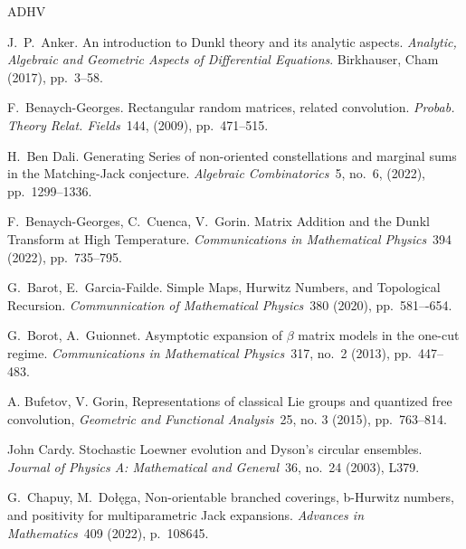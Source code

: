 \documentclass[11pt]{article}
\theoremstyle{plain}
\begin{document}
\begin{thebibliography}{ADHV}

J.~P.~Anker. An introduction to Dunkl theory and its analytic aspects. \emph{Analytic, Algebraic
and Geometric Aspects of Differential Equations}. Birkhauser, Cham (2017), pp.~3--58.

F.~Benaych-Georges. Rectangular random matrices, related convolution. \emph{Probab. Theory Relat. Fields}~144, (2009), pp.~471--515.


H.~Ben Dali. Generating Series of non-oriented constellations and marginal sums in the Matching-Jack conjecture. \emph{Algebraic Combinatorics}~5, no.~6, (2022), pp.~1299--1336.



F.~Benaych-Georges, C.~Cuenca, V.~Gorin. Matrix Addition and the Dunkl Transform at High Temperature. \emph{Communications in Mathematical Physics}~394 (2022), pp.~735--795.

G.~Barot, E.~Garcia-Failde. Simple Maps, Hurwitz Numbers, and Topological Recursion. \emph{Communnication of Mathematical Physics}~380 (2020), pp.~581–-654.

G.~Borot, A.~Guionnet. Asymptotic expansion of $\beta$ matrix models in the one-cut regime. \emph{Communications in Mathematical Physics}~317, no.~2 (2013), pp.~447--483.

 A. Bufetov, V. Gorin, Representations of classical Lie groups and quantized free convolution, \emph{Geometric and Functional Analysis}~25, no. 3 (2015), pp.~763--814.

John Cardy. Stochastic Loewner evolution and Dyson’s circular ensembles. \emph{Journal
of Physics A: Mathematical and General}~36, no.~24 (2003), L379.

G.~Chapuy, M.~Do\l{}\k{e}ga, Non-orientable branched coverings, b-Hurwitz numbers, and positivity for multiparametric Jack expansions. \emph{Advances in Mathematics}~409 (2022), p.~108645.


\end{thebibliography}
\end{document}
